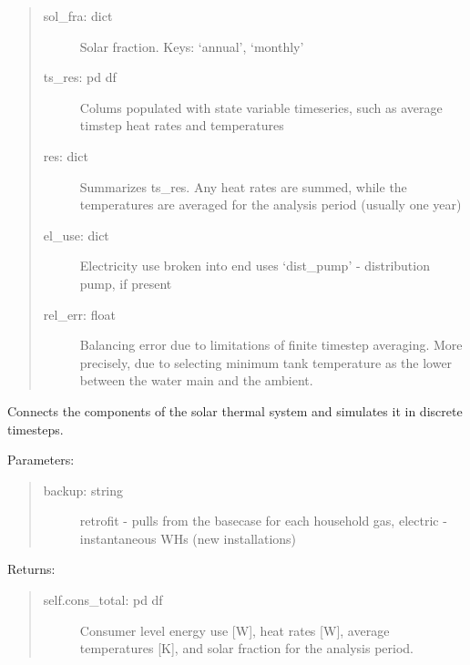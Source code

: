 \documentclass[letterpaper,10pt,english,openany]{sphinxmanual}
\begin{document}
\begin{fulllineitems}
\begin{fulllineitems}
\begin{quote}
\begin{description}
\item[{sol\_fra: dict}] \leavevmode
Solar fraction. Keys: ‘annual’, ‘monthly’

\item[{ts\_res: pd df}] \leavevmode
Colums populated with state variable timeseries, such as
average timstep heat rates and temperatures

\item[{res: dict}] \leavevmode
Summarizes ts\_res. Any heat rates are summed, while the
temperatures are averaged for the analysis period
(usually one year)

\item[{el\_use: dict}] \leavevmode
Electricity use broken into end uses
‘dist\_pump’ - distribution pump, if present

\item[{rel\_err: float}] \leavevmode
Balancing error due to limitations of finite
timestep averaging. More precisely, due to
selecting minimum tank temperature
as the lower between the water main and the ambient.

\end{description}
\end{quote}

\end{fulllineitems}


\begin{fulllineitems}
\label{\detokenize{source/mswh.system:mswh.system.models.System.solar_thermal}}
Connects the components of the solar thermal system and
simulates it in discrete timesteps.

Parameters:
\begin{quote}
\begin{description}
\item[{backup: string}] \leavevmode
retrofit - pulls from the basecase for each household
gas, electric - instantaneous WHs (new installations)

\end{description}
\end{quote}

Returns:
\begin{quote}
\begin{description}
\item[{self.cons\_total: pd df}] \leavevmode
Consumer level energy use {[}W{]}, heat rates {[}W{]},
average temperatures {[}K{]},
and solar fraction for the analysis period.


\end{description}
\end{quote}
\end{fulllineitems}
\end{fulllineitems}
\end{document}
